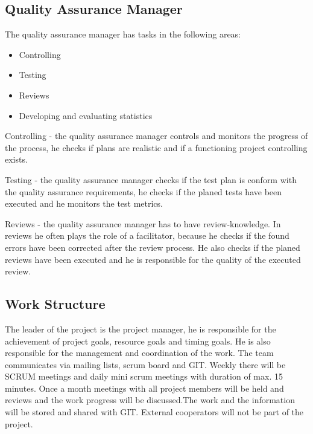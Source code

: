 \subsection{Quality Assurance Manager}
The quality assurance manager has tasks in the following areas:
\begin{itemize}
\item Controlling
\item Testing
\item Reviews
\item Developing and evaluating statistics
\end{itemize}

Controlling - the quality assurance manager controls and monitors the progress of the process, he checks if plans are realistic and if a functioning project controlling exists.

Testing - the quality assurance manager checks if the test plan is conform with the quality assurance requirements, he checks if the planed tests have been executed and he monitors the test metrics.

Reviews - the quality assurance manager has to have review-knowledge. In reviews he often plays the role of a facilitator, because he checks if the found errors have been corrected after the review process. He also checks if the planed reviews have been executed and he is responsible for the quality of the executed review.

\subsection{Work Structure}
The leader of the project is the project manager, he is responsible for the achievement of project goals, resource goals and timing goals. He is also responsible for the management and coordination of the work. The team communicates via mailing lists, scrum board and GIT. Weekly there will be SCRUM meetings and daily mini scrum meetings with duration of max. 15 minutes. Once a month meetings with all project members will be held and reviews and the work progress will be discussed.The work and the information will be stored and shared with GIT. External cooperators will not be part of the project.
